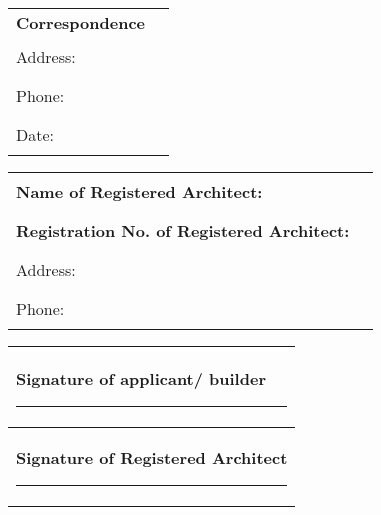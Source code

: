 \documentclass{article}
\begin{document}
\begin{tabular}{|l|l|}
\hline
\textbf{Correspondence} & \\
Address: & \rule{8cm}{0.15mm} \\
Phone: & \rule{8cm}{0.15mm} \\
Date: & \rule{8cm}{0.15mm} \\
\hline
\end{tabular}

\begin{tabular}{|l|l|}
\hline
\textbf{Name of Registered Architect:} & \rule{8cm}{0.15mm} \\
\textbf{Registration No. of Registered Architect:} & \rule{8cm}{0.15mm} \\
Address: & \rule{8cm}{0.15mm} \\
Phone: & \rule{8cm}{0.15mm} \\
\hline
\end{tabular}

\begin{tabular}{|l|}
\hline
\textbf{Signature of applicant/ builder} \rule{8cm}{0.15mm} \\
\hline
\textbf{Signature of Registered Architect} \rule{8cm}{0.15mm} \\
\hline
\end{tabular}
\end{document}
